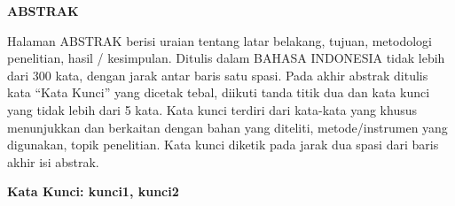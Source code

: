 \clearpage
{}%
\thispagestyle{fancy}

\begin{center}
	\large \bfseries \MakeUppercase{Abstrak}\\
	\bigskip
	
	\normalsize \normalfont \justifying \singlespacing
	Halaman ABSTRAK berisi uraian tentang latar belakang, tujuan, metodologi penelitian, hasil / kesimpulan. Ditulis dalam BAHASA INDONESIA tidak lebih dari 300 kata, dengan jarak antar baris satu spasi. Pada akhir abstrak ditulis kata “Kata Kunci” yang dicetak tebal, diikuti tanda titik dua dan kata kunci yang tidak lebih dari 5 kata. Kata kunci terdiri dari kata-kata yang khusus menunjukkan dan berkaitan dengan bahan yang diteliti, metode/instrumen yang digunakan, topik penelitian. Kata kunci diketik pada jarak dua spasi dari baris akhir isi abstrak.\par

    \vspace{20pt}
	\raggedright \textbf{Kata Kunci: kunci1, kunci2}
	
	\vfill
	
\end{center}
\clearpage